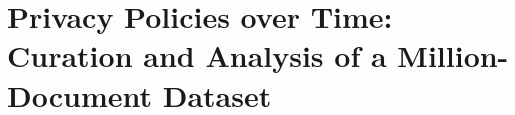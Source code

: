 \chapter{Privacy Policies over Time: Curation and Analysis of a Million-Document Dataset}  \label{ch:ppot}



% 





